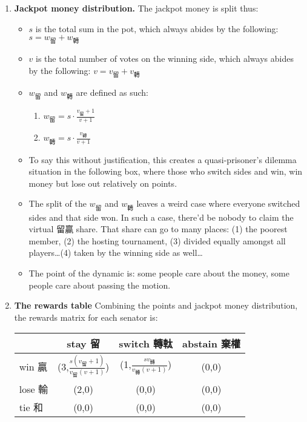 \begin{enumerate}
    \item \textbf{Jackpot money distribution.} The jackpot money is split thus:
    \begin{itemize}
        \item $s$ is the total sum in the pot, which always abides by the following: $s = w_{\text{留}} + w_{\text{轉}}$
        \item $v$ is the total number of votes on the winning side, which always abides by the following: $v = v_{\text{留}} + v_{\text{轉}}$
        \item $w_{\text{留}}$ and $w_{\text{轉}}$ are defined as such:
        \begin{enumerate}
            \item $w_{\text{留}} = s \cdot \frac{v_{\text{留}}+1}{v+1}$
            \item $w_{\text{轉}} = s \cdot \frac{v_{\text{轉}}}{v+1}$
        \end{enumerate}
        \item To say this without justification, this creates a quasi-prisoner's dilemma situation in the following box, where those who switch sides and win, win money but lose out relatively on points.
        \item The split of the $w_{\text{留}}$ and $w_{\text{轉}}$ leaves a weird case where everyone switched sides and that side won. In such a case, there'd be nobody to claim the virtual 留贏 share. That share can go to many places: (1) the poorest member, (2) the hosting tournament, (3) divided equally amongst all players\ldots (4) taken by the winning side as well\ldots
        \item The point of the dynamic is: some people care about the money, some people care about passing the motion.

    \end{itemize}

    \item \textbf{The rewards table} Combining the points and jackpot money distribution, the rewards matrix for each senator is:
    \begin{table}[h]
        \centering
        \begin{tabular}{l|ccc}
        \toprule
         & stay 留 & switch 轉軚 & abstain 棄權 \\
        \midrule
        win 贏 & (3,$\frac{s(v_{\text{留}}+1)}{v_{\text{留}}(v+1)}$)  & (1,$\frac{s v_{\text{轉}}}{v_{\text{轉}}(v+1)}$) & (0,0) \\
        lose 輸 & (2,0) & (0,0) & (0,0) \\
        tie 和 & (0,0) & (0,0) & (0,0) \\
        \bottomrule
        \end{tabular}
    \end{table}


\end{enumerate}
